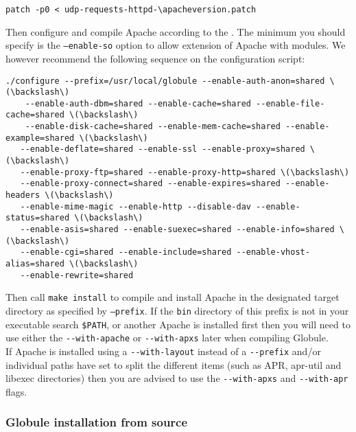 \documentclass[10pt,a4paper]{article}
\makeatletter
\newcommand{\apacheversion}{2.0.55}
\newenvironment{p}{\@open{P}{}}{\@close{P}}
\newenvironment{p}{}{\par}
\makeatother
\begin{document}
\begin{Verbatim}
patch -p0 < udp-requests-httpd-\apacheversion.patch
\end{Verbatim}

\begin{p}
Then configure and compile Apache according to the
.
The minimum you should specify is the \texttt{--enable-so} option to allow
extension of Apache with modules.  We however recommend the following sequence
on the configuration script:
\end{p}

\begin{Verbatim}
./configure --prefix=/usr/local/globule --enable-auth-anon=shared \(\backslash\)
    --enable-auth-dbm=shared --enable-cache=shared --enable-file-cache=shared \(\backslash\)
    --enable-disk-cache=shared --enable-mem-cache=shared --enable-example=shared \(\backslash\)
   --enable-deflate=shared --enable-ssl --enable-proxy=shared \(\backslash\)
   --enable-proxy-ftp=shared --enable-proxy-http=shared \(\backslash\)
   --enable-proxy-connect=shared --enable-expires=shared --enable-headers \(\backslash\)
   --enable-mime-magic --enable-http --disable-dav --enable-status=shared \(\backslash\)
   --enable-asis=shared --enable-suexec=shared --enable-info=shared \(\backslash\)
   --enable-cgi=shared --enable-include=shared --enable-vhost-alias=shared \(\backslash\)
   --enable-rewrite=shared
\end{Verbatim}

\begin{p}
Then call \verb!make install! to compile and install Apache in the designated
target directory as specified by \texttt{--prefix}.  If the \texttt{bin}
directory of this prefix is not in your executable search \verb!$PATH!, or
another Apache is installed first then you will need to use either the
\verb!--with-apache! or \verb!--with-apxs! later when compiling Globule. \\
If Apache is installed using a \verb!--with-layout! instead of a
\verb!--prefix! and/or individual paths have set to split the different items
(such as APR, apr-util and libexec directories) then you are advised to use
the \verb!--with-apxs! and \verb!--with-apr! flags.
\end{p}

\subsubsection{\label{sec:install:php}Globule installation from source}
\end{document}

